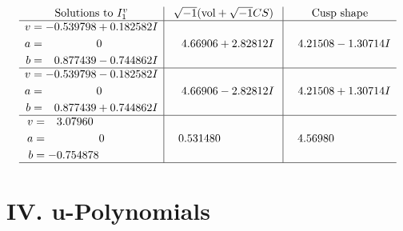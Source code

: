 \documentclass[1p]{elsarticle_modified}
\theoremstyle{definition}
\newcommand{\I}{\sqrt{-1}}
\begin{document}
$$\begin{array}{c|c|c}  
\text{Solutions to }I^v_{1}& \I (\text{vol} + \sqrt{-1}CS) & \text{Cusp shape}\\
 \hline 
\begin{aligned}
v &= -0.539798 + 0.182582 I \\
a &= \phantom{-0.000000 } 0 \\
b &= \phantom{-}0.877439 - 0.744862 I\end{aligned}
 & \phantom{-}4.66906 + 2.82812 I & \phantom{-}4.21508 - 1.30714 I \\ \hline\begin{aligned}
v &= -0.539798 - 0.182582 I \\
a &= \phantom{-0.000000 } 0 \\
b &= \phantom{-}0.877439 + 0.744862 I\end{aligned}
 & \phantom{-}4.66906 - 2.82812 I & \phantom{-}4.21508 + 1.30714 I \\ \hline\begin{aligned}
v &= \phantom{-}3.07960\phantom{ +0.000000I} \\
a &= \phantom{-0.000000 } 0 \\
b &= -0.754878\phantom{ +0.000000I}\end{aligned}
 & \phantom{-}0.531480\phantom{ +0.000000I} & \phantom{-}4.56980\phantom{ +0.000000I}\\
 \hline 
 \end{array}$$\newpage
\newpage\renewcommand{\arraystretch}{1}
\centering \section*{ IV. u-Polynomials}
\end{document}
